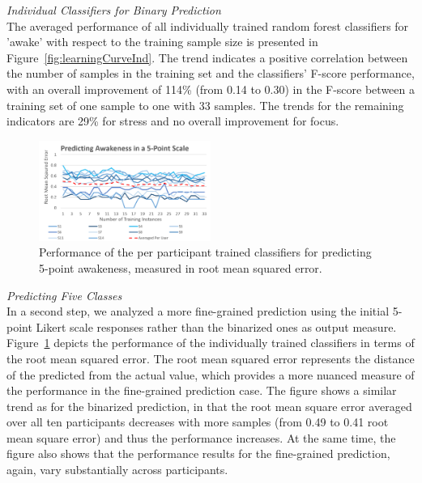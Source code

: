 \noindent\textit{Individual Classifiers for Binary Prediction}\\
The averaged performance of all individually trained random forest classifiers for 'awake' with respect to the training sample size is presented in Figure~\ref{fig:learningCurveInd}. The trend indicates a positive correlation between the number of samples in the training set and the classifiers' F-score performance, with an overall improvement of  114\% (from 0.14 to 0.30) in the F-score between a training set of one sample to one with 33 samples. The trends for
the remaining indicators are 29\% for stress and no overall improvement for focus.%


\begin{figure}
  \centering
      \includegraphics[width=0.5\textwidth]{20180914Awakeness5PointScaleOnly15Lines.png}
  \caption{Performance of the per participant trained classifiers for predicting 5-point awakeness, measured in root mean squared error.}
   \label{fig:learningCurve5}
\end{figure}

\noindent\textit{Predicting Five Classes}\\
In a second step, we analyzed a more fine-grained prediction using the initial 5-point Likert scale responses rather than the binarized ones as output measure. Figure~\ref{fig:learningCurve5} depicts the performance of the individually trained classifiers in terms of the root mean squared error. The root mean squared error represents the distance of the predicted from the actual value, which provides a more nuanced measure of the performance in the fine-grained prediction case. The figure shows a similar trend as for the binarized prediction, in that the root mean square error averaged over all ten participants decreases with more samples (from 0.49 to 0.41 root mean square error) and thus the performance increases. At the same time, the figure also shows that the performance results for the fine-grained prediction, again, vary substantially across participants.

